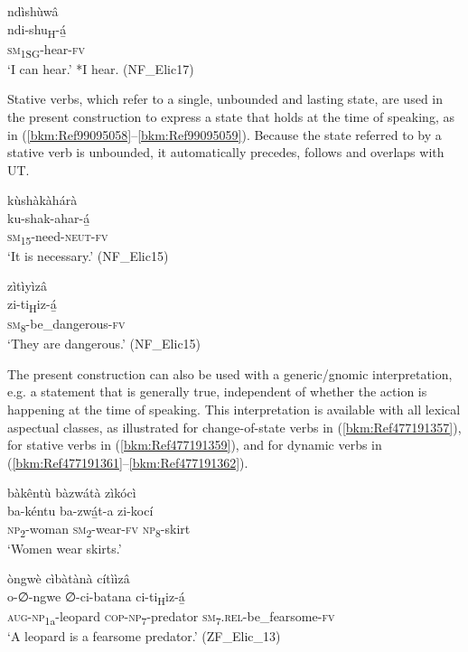 \ea
\label{bkm:Ref99095033}
\glll ndìshùwâ\\
ndi-shu\textsubscript{H}-á̲\\
\textsc{sm}\textsubscript{1SG}-hear-\textsc{fv}\\
\glt ‘I can hear.’ *I hear. (NF\_Elic17)
\z

Stative verbs, which refer to a single, unbounded and lasting state, are used in the present construction to express a state that holds at the time of speaking, as in (\ref{bkm:Ref99095058}--\ref{bkm:Ref99095059}). Because the state referred to by a stative verb is unbounded, it automatically precedes, follows and overlaps with UT.

\ea
\label{bkm:Ref99095058}
\glll kùshàkàhárà\\
ku-shak-ahar-á̲\\
\textsc{sm}\textsubscript{15}-need-\textsc{neut}-\textsc{fv}\\
\glt ‘It is necessary.’ (NF\_Elic15)
\z

\ea
\label{bkm:Ref99095059}
\glll zìtìyìzâ\\
zi-ti\textsubscript{H}iz-á̲\\
\textsc{sm}\textsubscript{8}-be\_dangerous-\textsc{fv}\\
\glt ‘They are dangerous.’ (NF\_Elic15)
\z

The present construction can also be used with a generic/gnomic interpretation, e.g. a statement that is generally true, independent of whether the action is happening at the time of speaking. This interpretation is available with all lexical aspectual classes, as illustrated for change-of-state verbs in (\ref{bkm:Ref477191357}), for stative verbs in (\ref{bkm:Ref477191359}), and for dynamic verbs in (\ref{bkm:Ref477191361}--\ref{bkm:Ref477191362}).

\ea
\label{bkm:Ref477191357}
bàkêntù bàzwátà zìkócì\\
\gll ba-kéntu  ba-zwá̲t-a  zi-kocí\\
\textsc{np}\textsubscript{2}-woman  \textsc{sm}\textsubscript{2}-wear-\textsc{fv}  \textsc{np}\-\textsubscript{8}-skirt\\
\glt ‘Women wear skirts.’
\z

\ea
\label{bkm:Ref477191359}
òngwè cìbàtànà cítììzâ\\
\gll o-∅-ngwe    ∅-ci-batana    ci-ti\textsubscript{H}iz-á̲\\
\textsc{aug}-\textsc{np}\textsubscript{1a}-leopard  \textsc{cop}-\textsc{np}\textsubscript{7}-predator  \textsc{sm}\textsubscript{7}.\textsc{rel}-be\_fearsome-\textsc{fv}\\
\glt ‘A leopard is a fearsome predator.’ (ZF\_Elic\_13)
\z

